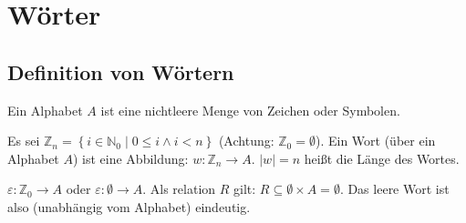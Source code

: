 
\chapter{Wörter}

\section{Definition von Wörtern}
\begin{definition}[Alphabet]
  Ein Alphabet $A$ ist eine nichtleere Menge von Zeichen oder Symbolen.
\end{definition}

\begin{definition}
  Es sei $\mathbb{Z}_n = \left\{ i \in \mathbb{N}_0 \middle| 0 \le i \wedge i < n \right\}$ (Achtung: $\mathbb{Z}_0 = \emptyset$). Ein Wort (über ein Alphabet $A$) ist eine Abbildung: $w: \mathbb{Z}_n \to A$. $|w| = n$ heißt die Länge des Wortes.
\end{definition}
\begin{remark}
  $\varepsilon: \mathbb{Z}_0 \to A$ oder $\varepsilon: \emptyset \to A$. Als relation $R$ gilt: $R \subseteq \emptyset \times A = \emptyset$. Das leere Wort ist also (unabhängig vom Alphabet) eindeutig.
\end{remark}